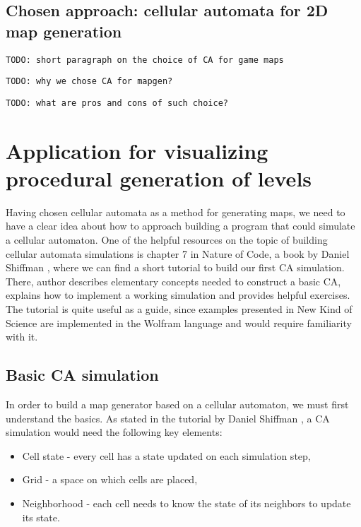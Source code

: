 \documentclass[12pt]{report}
\newcommand{\todo}[1]{}
\renewcommand{\todo}[1]{{\color{red} \par \noindent \footnotesize \texttt{TODO: {#1} }}}
\begin{document}
\section{Chosen approach: cellular automata for 2D map generation}

\todo{short paragraph on the choice of CA for game maps}
\todo{why we chose CA for mapgen?}
\todo{what are pros and cons of such choice?}

\chapter{Application for visualizing procedural generation of levels} \label{rozdzial.praktyka} 

Having chosen cellular automata as a method for generating maps, we need to have a clear idea about how to approach building a program that could simulate a cellular automaton. One of the helpful resources on the topic of building cellular automata simulations is chapter 7 in Nature of Code, a book by Daniel Shiffman \autocite{shiffman2012nature}, where we can find a short tutorial to build our first CA simulation. There, author describes elementary concepts needed to construct a basic CA, explains how to implement a working simulation and provides helpful exercises. The tutorial is quite useful as a guide, since examples presented in New Kind of Science \autocite{wolfram2002new} are implemented in the Wolfram language and would require familiarity with it.

\section{Basic CA simulation}

In order to build a map generator based on a cellular automaton, we must first understand the basics. As stated in the tutorial by Daniel Shiffman \autocite{shiffman2012nature}, a CA simulation would need the following key elements:

\begin{itemize}
	\item Cell state - every cell has a state updated on each simulation step,
	\item Grid - a space on which cells are placed,
	\item Neighborhood - each cell needs to know the state of its neighbors to update its state.
\end{itemize}
\end{document}
